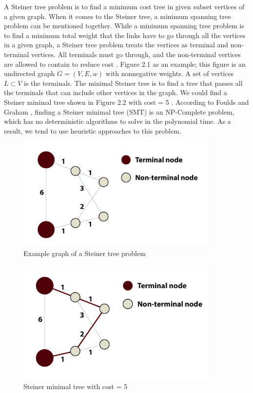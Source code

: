 A Steiner tree problem is to find a minimum cost tree in given subset vertices of a given graph. When it comes to the Steiner tree, a minimum spanning tree problem can be mentioned together. While a minimum spanning tree problem is to find a minimum total weight that the links have to go through all the vertices in a given graph, a Steiner tree problem treats the vertices as terminal and non-terminal vertices. All terminals must go through, and the non-terminal vertices are allowed to contain to reduce cost \cite{wu_steiner_nodate}. Figure 2.1 as an example; this figure is an undirected graph $G=(V, E, w)$ with nonnegative weights. A set of vertices $L \subset V$ is the terminals. The minimal Steiner tree is to find a tree that passes all the terminals that can include other vertices in the graph. We could find a Steiner minimal tree shown in Figure 2.2 with cost = 5 \cite{wuzhifeng_steiner_nodate}. According to Foulds and Graham \cite{foulds_steiner_1982}, finding a Steiner minimal tree (SMT) is an NP-Complete problem, which has no deterministic algorithms to solve in the polynomial time. As a result, we tend to use heuristic approaches to this problem.

\begin{figure}[htp]
  \centering
  \captionsetup{justification=centering}
  \includegraphics[width=10cm]{figures/steiner_1.jpg}
  \caption{Example graph of a Steiner tree problem}
\end{figure}

\begin{figure}[htp]
  \centering
  \captionsetup{justification=centering}
  \includegraphics[width=10cm]{figures/steiner_2.jpg}
  \caption{Steiner minimal tree with cost = 5}
\end{figure}

